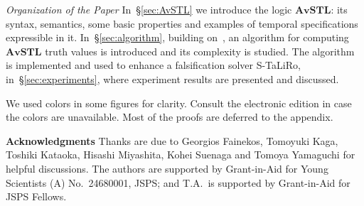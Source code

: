 \documentclass[envcountsect,orivec]{llncs} \usepackage{etex} \usepackage[]{graphicx}
\newcommand{\AvSTL}{\textbf{AvSTL}}
\begin{document}
\noindent
\textit{Organization of the Paper}\;
In~\S{}\ref{sec:AvSTL} we introduce the logic $\AvSTL$: its syntax,
semantics, some basic properties and examples of temporal specifications
expressible in it. In~\S{}\ref{sec:algorithm}, building
on~\cite{DBLP:conf/cav/DonzeFM13}, an algorithm for computing
$\AvSTL$ truth values is introduced and its complexity is studied.
The algorithm is implemented and used
to enhance a falsification solver S-TaLiRo,
in~\S{}\ref{sec:experiments}, where experiment results are presented and
discussed.

We used colors in some figures for clarity. Consult the electronic
edition  in case the colors are unavailable.  Most of the proofs are
deferred to the appendix.

\textbf{Acknowledgments}
Thanks are due to
Georgios Fainekos, 
Tomoyuki Kaga,  Toshiki Kataoka, 
Hisashi Miyashita,
Kohei Suenaga and
Tomoya Yamaguchi
 for helpful
 discussions. The authors are supported by Grant-in-Aid for Young
 Scientists (A) No.\ 24680001, JSPS; and 
T.A.\ is supported by Grant-in-Aid for JSPS Fellows.


















































    
\end{document}
